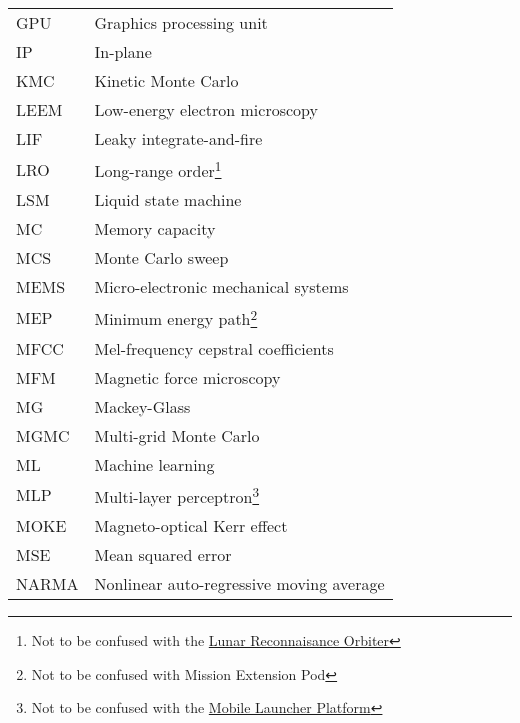 {\begin{longtable}[l]{ll}
        GPU   & Graphics processing unit                    \\
        IP    & In-plane                                    \\
        KMC   & Kinetic Monte Carlo                         \\
        LEEM  & Low-energy electron microscopy              \\
        LIF   & Leaky integrate-and-fire                    \\
        LRO   & Long-range order\footnote{Not to be confused with the \href{https://en.wikipedia.org/wiki/Lunar_Reconnaissance_Orbiter}{Lunar Reconnaisance Orbiter}} \\
        LSM   & Liquid state machine                        \\
        MC    & Memory capacity                             \\ %
        MCS   & Monte Carlo sweep                           \\
        MEMS  & Micro-electronic mechanical systems         \\
        MEP   & Minimum energy path\footnote{Not to be confused with Mission Extension Pod} \\
        MFCC  & Mel-frequency cepstral coefficients         \\
        MFM   & Magnetic force microscopy                   \\
        MG    & Mackey-Glass                                \\
        MGMC  & Multi-grid Monte Carlo                      \\
        ML    & Machine learning                            \\
        MLP   & Multi-layer perceptron\footnote{Not to be confused with the \href{https://en.wikipedia.org/wiki/Mobile_launcher_platform}{Mobile Launcher Platform}} \\ %
        MOKE  & Magneto-optical Kerr effect                 \\
        MSE   & Mean squared error                          \\
        NARMA & Nonlinear auto-regressive moving average    \\

\end{longtable}}
